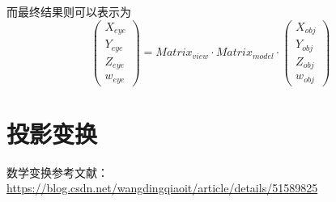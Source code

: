 \documentclass[UTF8,a4paper,12pt]{ctexbook}
\begin{document}
				而最终结果则可以表示为
				$$ 	
				\left(
				\begin{array}{c}
				X_{eye}\\ 
				Y_{eye}\\
				Z_{eye}\\
				w_{eye}
				\end{array}	
				\right) 
				=
				Matrix_{view}
				\cdot
				Matrix_{model}
				\cdot
				\left(
				\begin{array}{c}
				X_{obj}\\ 
				Y_{obj}\\
				Z_{obj}\\
				w_{obj}
				\end{array}	
				\right) 
				$$
				
	\section{投影变换}
			数学变换参考文献：\url{https://blog.csdn.net/wangdingqiaoit/article/details/51589825}
			
\end{document}
